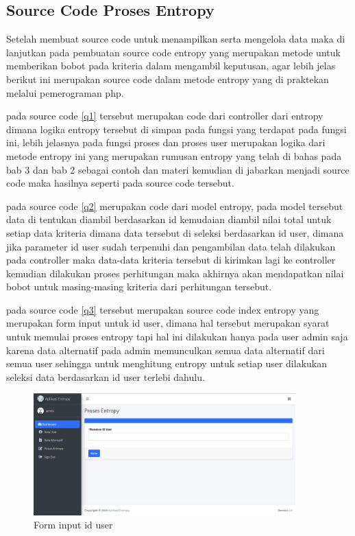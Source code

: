 \subsection{Source Code Proses Entropy}
	Setelah membuat source code untuk menampilkan serta mengelola data maka di lanjutkan pada pembuatan source code entropy yang merupakan metode untuk memberikan bobot pada kriteria dalam mengambil keputusan, agar lebih jelas berikut ini merupakan source code dalam metode entropy yang di praktekan melalui pemerograman php.

pada source code \ref{q1} tersebut merupakan code dari controller dari entropy dimana logika entropy tersebut di simpan pada fungsi yang terdapat pada fungsi ini, lebih jelasnya pada fungsi proses dan proses user merupakan logika dari metode entropy ini yang merupakan rumusan entropy yang telah di bahas pada bab 3 dan bab 2 sebagai contoh dan materi kemudian di jabarkan menjadi source code maka hasilnya seperti pada source code tersebut.


pada source code \ref{q2} merupakan code dari model entropy, pada model tersebut data di tentukan diambil berdasarkan id kemudaian diambil nilai total untuk setiap data kriteria dimana data tersebut di seleksi berdasarkan id user, dimana jika parameter id user sudah terpenuhi dan pengambilan data telah dilakukan pada controller maka data-data kriteria tersebut di kirimkan lagi ke controller kemudian dilakukan proses perhitungan maka akhirnya akan mendapatkan nilai bobot untuk masing-masing kriteria dari perhitungan tersebut.


pada source code \ref{q3} tersebut merupakan source code index entropy yang merupakan form input untuk id user, dimana hal tersebut merupakan syarat untuk memulai proses entropy tapi hal ini dilakukan hanya pada user admin saja karena data alternatif pada admin memunculkan semua data alternatif dari semua user sehingga untuk menghitung entropy untuk setiap user dilakukan seleksi data berdasarkan id user terlebi dahulu.
\begin{figure}[!htbp]
	\centerline{\includegraphics[width=0.90\textwidth]{figures/en/1.png}}
	\caption{Form input id user}
	\label{py1}
\end{figure}

